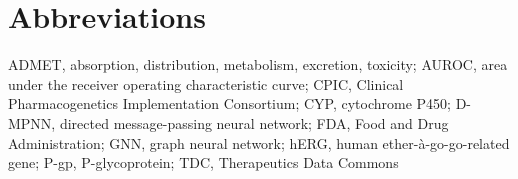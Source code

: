 \documentclass[11pt]{article}
\begin{document}
\section*{Abbreviations}

ADMET, absorption, distribution, metabolism, excretion, toxicity; AUROC, area under the receiver operating characteristic curve; CPIC, Clinical Pharmacogenetics Implementation Consortium; CYP, cytochrome P450; D-MPNN, directed message-passing neural network; FDA, Food and Drug Administration; GNN, graph neural network; hERG, human ether-\`a-go-go-related gene; P-gp, P-glycoprotein; TDC, Therapeutics Data Commons



\end{document}
